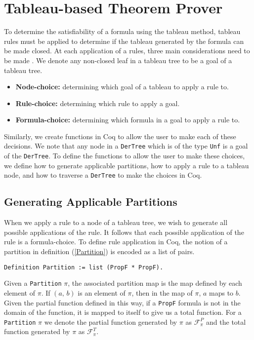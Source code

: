 \documentclass{llncs}
\begin{document}
\section{Tableau-based Theorem Prover}\label{Tableau-based Theorem Prover}
%
To determine the satisfiability of a formula using the tableau method, tableau
rules must be applied to determine if the tableau generated by the formula can
be made closed.  At each application of a rules, three main considerations need
to be made \cite{abate2007tableau, kelly2009revised}. We denote any non-closed
leaf in a tableau tree to be a goal of a tableau tree.
%
\begin{itemize}
\item \textbf{Node-choice:} determining which goal of a tableau to apply a rule
to.
\item \textbf{Rule-choice:} determining which rule to apply a goal.
\item \textbf{Formula-choice:} determining which formula in a goal to apply
a rule to.
\end{itemize}
%
Similarly, we create functions in Coq to allow the user to make each of these
decisions. We note that any node in a \verb+DerTree+ which is of the type
\verb+Unf+ is a goal of the \verb+DerTree+. To define the functions to allow
the user to make these choices, we define how to generate applicable
partitions, how to apply a rule to a tableau node, and how to traverse a
\verb+DerTree+ to make the choices in Coq.
%
\subsection{Generating Applicable Partitions}
%
When we apply a rule to a node of a tableau tree, we wish to generate all
possible applications of the rule. It follows that each possible application of
the rule is a formula-choice. To define rule application in Coq, the notion of
a partition in definition (\ref{Partition}) is encoded as a list of pairs.
%
\begin{verbatim}
Definition Partition := list (PropF * PropF).
\end{verbatim}
%
Given a \verb+Partition+ $\pi$, the associated partition map is the map defined
by each element of $\pi$. If $(a, \, b)$ is an element of $\pi$, then in the
map of $\pi$, $a$ maps to $b$. Given the partial function defined in this way,
if a \verb+PropF+ formula is not in the domain of the function, it is mapped to
itself to give us a total function. For a \verb+Partition+ $\pi$ we denote the 
partial function generated by $\pi$ as $\mathcal{F}^{P}_{\pi}$ and the total
function generated by $\pi$ as $\mathcal{F}^{T}_{\pi}$.
\end{document}

